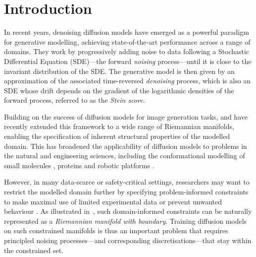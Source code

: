 \section{Introduction}

In recent years, denoising diffusion models \parencite{sohl2015deep,song2019generative,song2020score,ho2020denoising} have emerged as a powerful paradigm for generative modelling, achieving state-of-the-art performance across a range of domains.
They work by progressively adding noise to data following a Stochastic Differential Equation (SDE)---the forward \emph{noising} process---until it is close to the invariant distribution of the SDE.
The generative model is then given by an approximation of the associated time-reversed \emph{denoising} process, which is also an SDE whose drift depends on the gradient of the logarithmic densities of the forward process, referred to as the \emph{Stein score}.

Building on the success of diffusion models for image generation tasks, \textcite{de2022riemannian} and \textcite{huang2022riemannian} have recently extended this framework to a wide range of Riemannian manifolds, enabling the specification of inherent structural properties of the modelled domain.
This has broadened the applicability of diffusion models to problems in the natural and engineering sciences, including the conformational modelling of small molecules \parencite{jing2022torsional, corso2023diffdock}, proteins \parencite{trippe2022Diffusion,watson2022Broadly,yim2023se} and robotic platforms \parencite{urain2022se}.

However, in many data-scarce or safety-critical settings, researchers may want to restrict the modelled domain further by specifying problem-informed constraints to make maximal use of limited experimental data or prevent unwanted behaviour \parencite{Morris2002,han2006inverse,Thiele2013,lukens2020practical}.
As illustrated in~, such domain-informed constraints can be naturally represented as a \emph{Riemannian manifold with boundary}.
Training diffusion models on such constrained manifolds is thus an important problem that requires principled noising processes---and corresponding discretisations---that stay within the constrained set.

